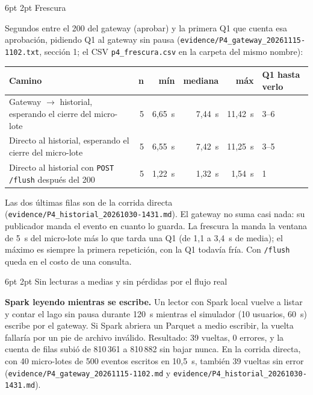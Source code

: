\documentclass[10pt,letterpaper]{article}
\makeatletter
\newcommand{\ev}[1]{{\footnotesize\texttt{evidence/\allowbreak #1}}}
\renewcommand\subsection{\@startsection{subsection}{2}{\z@}%
  {6pt \@plus 1pt}{2pt}%
  {\normalfont\normalsize\bfseries\color{acc}}}
\makeatother
\begin{document}
\subsection{Frescura}

Segundos entre el 200 del gateway (aprobar) y la primera Q1 que cuenta esa aprobación, pidiendo Q1 al
gateway sin pausa (\ev{P4\_gateway\_20261115-1102.txt}, sección 1; el CSV \texttt{p4\_frescura.csv} en la
carpeta del mismo nombre):

\begin{center}\footnotesize
\begin{tabular}{@{}lrrrrl@{}}
\toprule
Camino & n & mín & mediana & máx & Q1 hasta verlo \\
\midrule
Gateway $\rightarrow$ historial, esperando el cierre del micro-lote & 5 & 6,65~s & 7,44~s & 11,42~s & 3--6 \\
Directo al historial, esperando el cierre del micro-lote & 5 & 6,55~s & 7,42~s & 11,25~s & 3--5 \\
Directo al historial con \texttt{POST /flush} después del 200 & 5 & 1,22~s & 1,32~s & 1,54~s & 1 \\
\bottomrule
\end{tabular}
\end{center}

Las dos últimas filas son de la corrida directa (\ev{P4\_historial\_20261030-1431.md}). El gateway no suma
casi nada: su publicador manda el evento en cuanto lo guarda. La frescura la manda la ventana de 5~s del
micro-lote más lo que tarda una Q1 (de 1,1 a 3,4~s de media); el máximo es siempre la primera repetición,
con la Q1 todavía fría. Con \texttt{/flush} queda en el costo de una consulta.

\subsection{Sin lecturas a medias y sin pérdidas por el flujo real}

\textbf{Spark leyendo mientras se escribe.} Un lector con Spark local vuelve a listar y contar el lago sin
pausa durante 120~s mientras el simulador (10 usuarios, 60~s) escribe por el gateway. Si Spark abriera un
Parquet a medio escribir, la vuelta fallaría por un pie de archivo inválido. Resultado: 39 vueltas, 0
errores, y la cuenta de filas subió de 810\,361 a 810\,882 sin bajar nunca. En la corrida directa, con 40
micro-lotes de 500 eventos escritos en 10,5~s, también 39 vueltas sin error
(\ev{P4\_gateway\_20261115-1102.md} y \ev{P4\_historial\_20261030-1431.md}).
\end{document}
